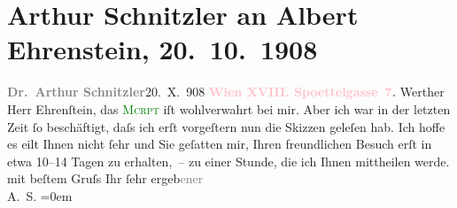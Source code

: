 

               \section[Arthur Schnitzler an Albert Ehrenstein, 20. 10. 1908]{ Arthur Schnitzler an Albert Ehrenstein, 20. 10. 1908}\nopagebreak{}\rehead{ }\normalsize\beginnumbering{} \toendnotes[C]{\smallbreak\pagebreak[2]} 
\toendnotes[C]{\smallbreak}\pstart
           \noindent{}{\pb}\textcolor{gray}{\textbf{Dr. Arthur Schnitzler}}\hfill 20. X. 908\pend
           \pstart
           \textcolor{gray}{\textbf{\textcolor{pink}{Wien XVIII. Spoettelgasse 7}{}\ledrightnote{\textcolor{pink}{Edmund-Weiß-Gasse}}.}}\pend
           \pstart
           Werther Herr Ehrenſtein, das \textcolor{green}{\textsc{Mcrpt}}{} iſt wohlverwahrt bei mir. Aber ich war in der letzten Zeit ſo beschäftigt,
                    daſs ich erſt vorgeſtern nun die Skizzen geleſen hab. Ich hoffe {\pb}es eilt Ihnen nicht ſehr und Sie geſatten mir, Ihren
                    freundlichen Besuch erſt in etwa 10–14 Tagen zu erhalten, – zu einer Stunde, die
                    ich Ihnen mittheilen werde.\pend
           \pstart
           mit beſtem Gruſs Ihr ſehr ergeb\textcolor{gray}{ener}{\\[\baselineskip]}\spacefill\mbox{A. S.}\pend
           \leftskip=0em{}\endnumbering{}  
      